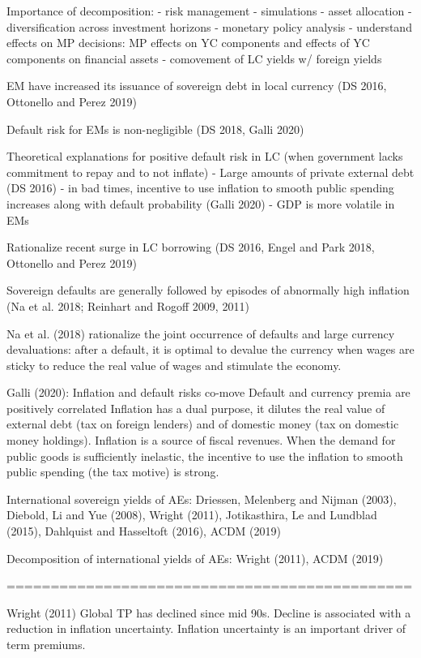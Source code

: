 
Importance of decomposition:
- risk management
	- simulations
- asset allocation
	- diversification across investment horizons
- monetary policy analysis
	- understand effects on MP decisions: MP effects on YC components and effects of YC components on financial assets
	- comovement of LC yields w/ foreign yields


EM have increased its issuance of sovereign debt in local currency (DS 2016, Ottonello and Perez 2019)

Default risk for EMs is non-negligible (DS 2018, Galli 2020)

Theoretical explanations for positive default risk in LC (when government lacks commitment to repay and to not inflate)
- Large amounts of private external debt (DS 2016)
- in bad times, incentive to use inflation to smooth public spending increases along with default probability (Galli 2020)
- GDP is more volatile in EMs

Rationalize recent surge in LC borrowing (DS 2016, Engel and Park 2018, Ottonello and Perez 2019)

Sovereign defaults are generally followed by episodes of abnormally high inflation (Na et al. 2018; Reinhart and Rogoff 2009, 2011)

Na et al. (2018) rationalize the joint occurrence of defaults and large currency devaluations: after a default, it is optimal to devalue the currency when wages are sticky to reduce the real value of wages and stimulate the economy.

Galli (2020): 
Inflation and default risks co-move
Default and currency premia are positively correlated
Inflation has a dual purpose, it dilutes the real value of external debt (tax on foreign lenders) and of domestic money (tax on domestic money holdings).
Inflation is a source of fiscal revenues.
When the demand for public goods is sufficiently inelastic, the incentive to use the inflation to smooth public spending (the tax motive) is strong.

International sovereign yields of AEs: Driessen, Melenberg and Nijman (2003), Diebold, Li and Yue (2008), Wright (2011), Jotikasthira, Le and Lundblad (2015), Dahlquist and Hasseltoft (2016), ACDM (2019)

Decomposition of international yields of AEs: Wright (2011), ACDM (2019)

==============================================

Wright (2011)
Global TP has declined since mid 90s.
Decline is associated with a reduction in inflation uncertainty.
Inflation uncertainty is an important driver of term premiums.

